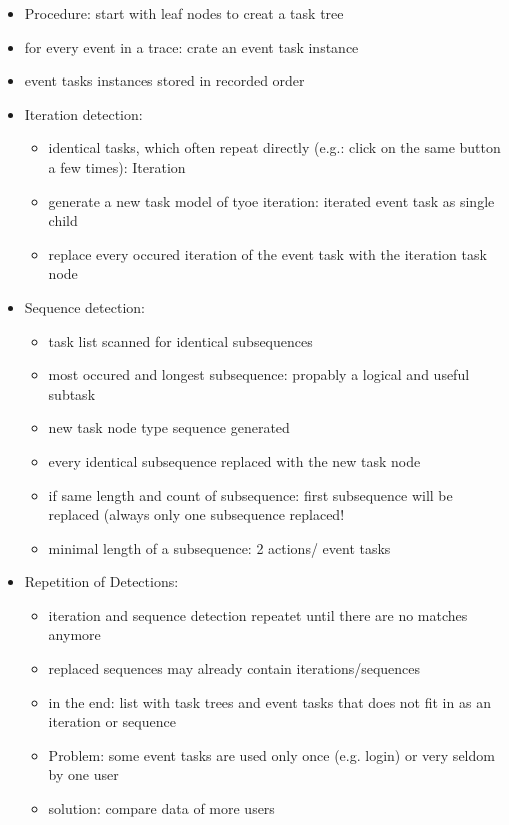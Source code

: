 \begin{itemize}
	
	\item Procedure: start with leaf nodes to creat a task tree
 	\item for every event in a trace: crate an event task instance
  	\item event tasks instances stored in recorded order

	\item Iteration detection:
	\begin{itemize} 
		\item identical tasks, which often repeat directly (e.g.: click on the same button a few times): Iteration
		\item generate a new task model of tyoe iteration: iterated event task as single child
		\item replace every occured iteration of the event task with the iteration task node 
	\end{itemize}

	\item Sequence detection:
	\begin{itemize}
		\item task list scanned for identical subsequences
    		\item most occured and longest subsequence: propably a logical and useful subtask
		\item new task node type sequence generated
		\item every identical subsequence replaced with the new task node 
		\item if same length and count of subsequence: first subsequence will be replaced (always only one subsequence replaced!
    		\item minimal length of a subsequence: 2 actions/ event tasks
	\end{itemize}
	\item Repetition of Detections:
	\begin{itemize}
		\item iteration and sequence detection repeatet until there are no matches anymore
  		\item replaced sequences may already contain iterations/sequences 
		\item in the end: list with task trees and event tasks that does not fit in as an iteration or sequence
		\item Problem: some event tasks are used only once (e.g. login) or very seldom by one user
		\item solution: compare data of more users 
	\end{itemize}
\end{itemize}
